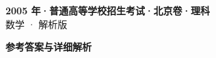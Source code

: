 \documentclass[zihao=-4, a4paper]{ctexart}
\begin{document}
\begin{center}
  {\Large\bfseries 2005 年·普通高等学校招生考试·北京卷·理科}\\[4pt]
  {\large 数学 · 解析版}
\end{center}
\medskip
{}

\clearpage
{}
\begin{center}{\Large\bfseries 参考答案与详细解析}\end{center}
\medskip

\end{document}
